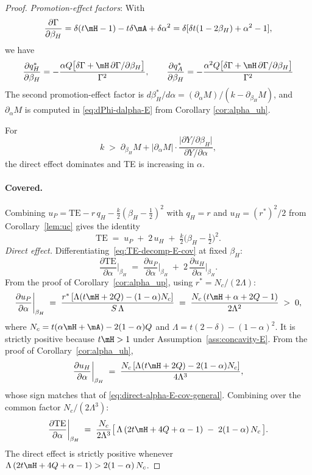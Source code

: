 \begin{proof}
\emph{Promotion-effect factors}: 
With
\[
\frac{\partial\Gamma}{\partial\beta_H} = \delta(t\mH-1)-t\delta\mA +\delta \alpha^2 =  \delta[\delta t(1-2\beta_H) + \alpha^2 - 1],
\]
we have
\[
\frac{\partial q_H^*}{\partial\beta_H}
= -\frac{\alpha Q\bigl[\delta\Gamma + \mH\,\partial\Gamma/\partial\beta_H\bigr]}{\Gamma^2},
\qquad
\frac{\partial q_A^*}{\partial\beta_H}
= -\frac{\alpha^2 Q\bigl[\delta\Gamma + \mH\,\partial\Gamma/\partial\beta_H\bigr]}{\Gamma^2}
\]
The second promotion-effect factor is
$d\beta_H^*/d\alpha = (\partial_\alpha M)/(k -
\partial_{\beta_H}M)$, and  $\partial_\alpha M$ is computed in \eqref{eq:dPhi-dalpha-E} from Corollary \ref{cor:alpha_uh}.

For
\begin{equation}\label{eq:kbar-alpha-Y-E}
k \;>\; \partial_{\beta_H}M
+ \bigl|\partial_\alpha M\bigr|\cdot
\frac{\bigl|\partial Y/\partial\beta_H\bigr|}{\partial Y/\partial\alpha},
\end{equation}
the direct effect dominates and TE is increasing in $\alpha$.


\medskip
\paragraph{Covered.}\;
Combining $u_P = \text{TE} - r\,q_H
- \tfrac{k}{2}(\beta_H - \tfrac12)^2$ with $q_H = r$ and
$u_H = (r^*)^2/2$ from Corollary~\ref{lem:uc} gives the identity
\begin{equation}\label{eq:TE-decomp-E-cov}
\text{TE} \;=\; u_P \;+\; 2\,u_H \;+\; \tfrac{k}{2}\bigl(\beta_H - \tfrac12\bigr)^2.
\end{equation}
\textit{Direct effect.}\;
Differentiating~\eqref{eq:TE-decomp-E-cov} at fixed $\beta_H$:
\[
\frac{\partial\text{TE}}{\partial\alpha}\bigg|_{\beta_H}
\;=\; \frac{\partial u_P}{\partial\alpha}\bigg|_{\beta_H}
\;+\; 2\,\frac{\partial u_H}{\partial\alpha}\bigg|_{\beta_H}.
\]
From the proof of Corollary~\ref{cor:alpha_up}, using $r^* = N_c/(2\Lambda)$:
\[
\frac{\partial u_P}{\partial\alpha}\bigg|_{\beta_H}
\;=\; \frac{r^*\,[\Lambda(t\mH+2Q) - (1-\alpha)N_c]}{S\,\Lambda}
\;=\; \frac{N_c\,(t\mH + \alpha + 2Q - 1)}{2\Lambda^2}
\;>\; 0,
\]
where $N_c = t(\alpha\mH + \mA) - 2(1-\alpha)Q$ and $\Lambda=t(2-\delta)-(1-\alpha)^{2}$. It is strictly positive because $t\mH > 1$ under Assumption~\ref{ass:concavity-E}.
From the proof of Corollary~\ref{cor:alpha_uh},
\[
\frac{\partial u_H}{\partial\alpha}\bigg|_{\beta_H}
\;=\; \frac{N_c\,[\Lambda(t\mH+2Q) - 2(1-\alpha)N_c]}{4\Lambda^3},
\]
whose sign matches that of \eqref{eq:direct-alpha-E-cov-general}.
Combining over the common factor $N_c/(2\Lambda^3)$:
\begin{equation}\label{eq:dTE-dalpha-E-cov}
\frac{\partial\text{TE}}{\partial\alpha}\bigg|_{\beta_H}
\;=\; \frac{N_c}{2\Lambda^3}\bigl[\,\Lambda\,(2t\mH + 4Q + \alpha - 1)
\;-\; 2(1-\alpha)\,N_c\,\bigr].
\end{equation}
The direct effect is strictly positive whenever
$\Lambda\,(2t\mH + 4Q + \alpha - 1) > 2(1-\alpha)\,N_c$. 


\end{proof}
